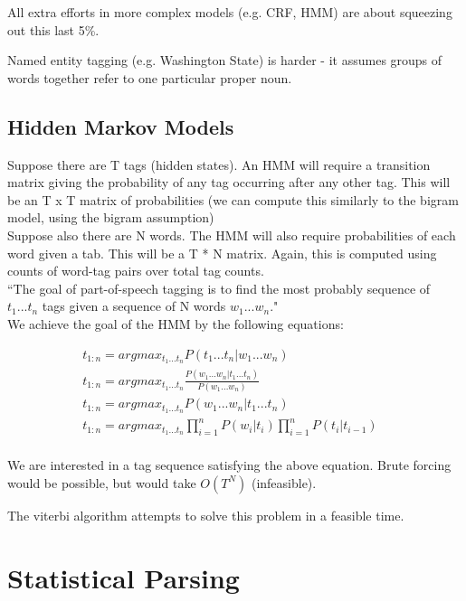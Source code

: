 \documentclass[]{article}
\begin{document}
	All extra efforts in more complex models (e.g. CRF, HMM) are about squeezing out this last 5\%. 
	
	Named entity tagging (e.g. Washington State) is harder - it assumes groups of words together refer to one particular proper noun. 
	
	\subsection{Hidden Markov Models}
	Suppose there are T tags (hidden states). An HMM will require a transition matrix giving the probability of any tag occurring after any other tag. This will be an T x T matrix of probabilities (we can compute this similarly to the bigram model, using the bigram assumption)
	\\
	Suppose also there are N words. The HMM will also require probabilities of each word given a tab. This will be a T * N matrix. Again, this is computed using counts of word-tag pairs over total tag counts. 
	\\
	``The goal of part-of-speech tagging is to find the most probably sequence of $t_1...t_n$ tags given a sequence of N words $w_1...w_n$."  
	\\
	We achieve the goal of the HMM by the following equations:
	
	\begin{align}	
		t_{1:n} = argmax_{t_1...t_n} P(t_1...t_n | w_1...w_n) &\tag*{max prb tags given words} \\	
		t_{1:n} = argmax_{t_1...t_n} \frac{P(w_1...w_n | t_1...t_n)}{P(w_1...w_n)} &\tag*{by bayes rule} \\	
		t_{1:n} = argmax_{t_1...t_n} P(w_1...w_n | t_1...t_n) &\tag*{since argmax, can discard denom} \\	
		t_{1:n} = argmax_{t_1...t_n} \prod_{i=1}^n P(w_i|t_i) \prod_{i=1}^n P(t_i|t_{i-1}) &\tag*{by the HMM assumptions} \\	
	\end{align}
	
	We are interested in a tag sequence satisfying the above equation. Brute forcing would be possible, but would take $O(T^N)$ (infeasible). 
	
	The viterbi algorithm attempts to solve this problem in a feasible time.
	
	
	
	\clearpage
	\section{Statistical Parsing}
	
\end{document}
